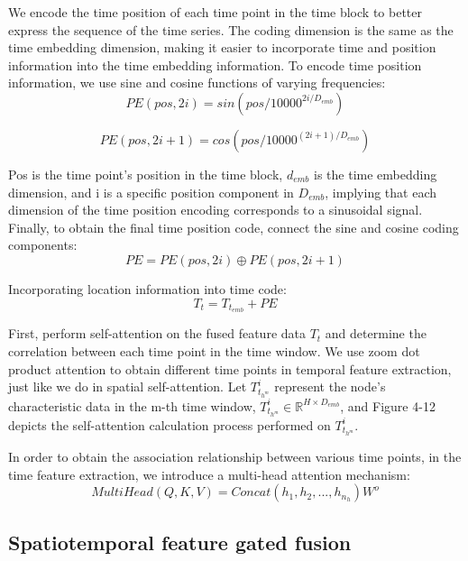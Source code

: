 \documentclass[conference]{IEEEtran}
\begin{document}
\par
We encode the time position of each time point in the time block to better express the sequence of the time series. The coding dimension is the same as the time embedding dimension, making it easier to incorporate time and position information into the time embedding information. To encode time position information, we use sine and cosine functions of varying frequencies:
\begin{equation}
    PE(pos, 2i) = sin(pos/10000^{2i/D_{emb}})
\end{equation}

\begin{equation}
    PE(pos, 2i + 1) = cos(pos/10000^{(2i + 1)/D_{emb}})
\end{equation}
\par
Pos is the time point's position in the time block, $d_ {emb}$ is the time embedding dimension, and i is a specific position component in $D_{emb}$, implying that each dimension of the time position encoding corresponds to a sinusoidal signal. Finally, to obtain the final time position code, connect the sine and cosine coding components:
\begin{equation}
    PE = PE(pos,2i)\oplus PE(pos,2i + 1)
\end{equation}
\par
Incorporating location information into time code:
\begin{equation}
   T_t = T_{t_{emb}} + PE
\end{equation}
\par
First, perform self-attention on the fused feature data $T_t$ and determine the correlation between each time point in the time window. We use zoom dot product attention to obtain different time points in temporal feature extraction, just like we do in spatial self-attention. Let $T^i_{t_{h^m}}$ represent the node's characteristic data in the m-th time window, $T^i_{t_{h^m}} \in \mathbb{R}^{H \times D_{emb}} $, and Figure 4-12 depicts the self-attention calculation process performed on $T^i_{t_{h^m}}$.
\par
In order to obtain the association relationship between various time points, in the time feature extraction, we introduce a multi-head attention mechanism:
\begin{equation}
      MultiHead(Q,K,V) = Concat(h_1,h_2,... ,h_{n_{h}})W^o
\end{equation}
\subsection{Spatiotemporal feature gated fusion}
\end{document}
